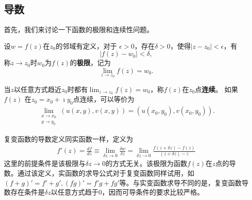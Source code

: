 \subsection{导数}

首先，我们来讨论一下函数的极限和连续性问题。
\begin{Definition}
    设$w=f(z)$在$z_0$的邻域有定义，对于
$\epsilon > 0$，存在$\delta > 0$，使得$|z-z_0| < \epsilon$，有
\begin{equation}
    |f(z) - w_0| < \delta ,
\end{equation}
称$z\to z_0$时$w_0$为$f(z)$的{\bf 极限}，记为
\begin{equation}
    \lim_{z\to z_0} f(z) = w_0 .
\end{equation}
\end{Definition}
当$z$以任意方式趋近$z_0$时都有$ \lim_{z\to z_0} f(z) = w_0$，称$f(z)$在$z_0$点{\bf 连续}。
如果$f(z)$ 在$z_0=x_0 + \imath y_0$点连续，可以等价为
\begin{align}
    \lim_{\substack{x\to x_0\\y\to y_0}} \left(u(x,y), v(x,y)\right) = \left(u(x_0, y_0), v(x_0, y_0)\right) . 
\end{align}

复变函数的导数定义同实函数一样，定义为
\begin{align}
    \label{eq:derivative_def}
    f'(z) = \frac{df}{dz} 
    \equiv\lim_{\delta z \to 0} \frac{\delta w} {\delta z} 
    = \lim_{\delta z\to 0} \frac{f(z+\delta z) - f(z) } {(z+\delta z ) - z}
\end{align}
这里的前提条件是该极限与$\delta z \to 0$的方式无关。该极限为函数$f(z)$在$z$点的导数。通过该定义，实函数的求导公式对于复变函数同样试用，如
$(f+g)' = f' + g', (fg)' =f'g + fg'$等。与实变函数求导不同的是，复变函数导数存在条件是$\delta z$以任意方式趋于$0$，因而可导条件的要求比较严格。

